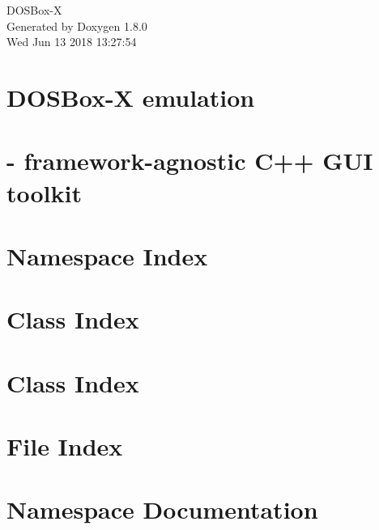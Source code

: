 \documentclass{book}
\begin{document}
\hypersetup{pageanchor=false,citecolor=blue}
\begin{titlepage}
\vspace*{7cm}
\begin{center}
{\Large D\-O\-S\-Box-\/\-X }\\
\vspace*{1cm}
{\large Generated by Doxygen 1.8.0}\\
\vspace*{0.5cm}
{\small Wed Jun 13 2018 13:27:54}\\
\end{center}
\end{titlepage}
\clearemptydoublepage
{}
\tableofcontents
\clearemptydoublepage
{}
\hypersetup{pageanchor=true,citecolor=blue}
\chapter{D\-O\-S\-Box-\/\-X emulation}
\label{index}\hypertarget{index}{}
\chapter{-\/ framework-\/agnostic C++ G\-U\-I toolkit}
\label{gui::tk}
\hypertarget{gui::tk}{}

\chapter{Namespace Index}

\chapter{Class Index}

\chapter{Class Index}

\chapter{File Index}

\chapter{Namespace Documentation}


\end{document}
